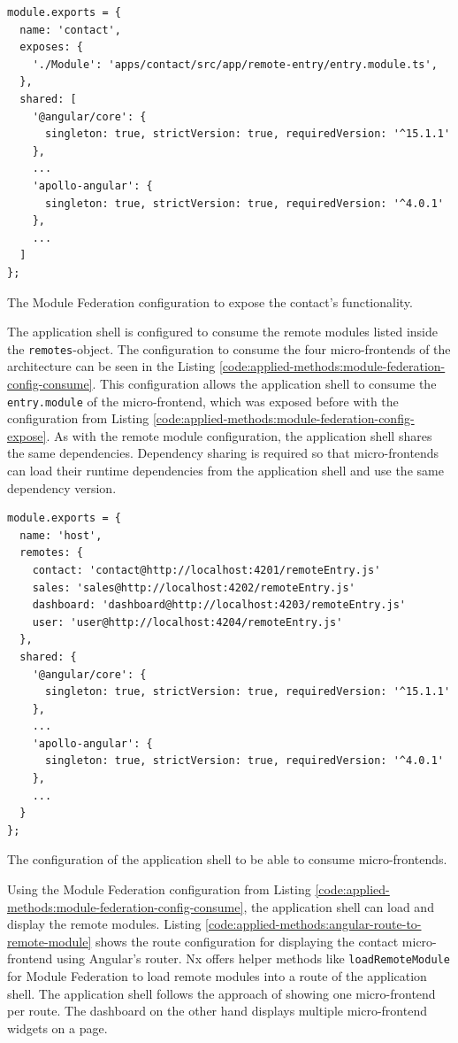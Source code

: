 \ifshowListings
\begin{listing}[H]
  \begin{verbatim}
module.exports = {
  name: 'contact',
  exposes: {
    './Module': 'apps/contact/src/app/remote-entry/entry.module.ts',
  },
  shared: [
    '@angular/core': {
      singleton: true, strictVersion: true, requiredVersion: '^15.1.1' 
    },
    ...
    'apollo-angular': { 
      singleton: true, strictVersion: true, requiredVersion: '^4.0.1' 
    },
    ...
  ]
};
  \end{verbatim}
  \caption{The Module Federation configuration to expose the contact's functionality.}\label{code:applied-methods:module-federation-config-expose}
\end{listing}
\fi

\noindent The application shell is configured to consume the remote modules listed inside the \texttt{remotes}-object. The configuration to consume the four micro-frontends of the architecture can be seen in the Listing \ref{code:applied-methods:module-federation-config-consume}. This configuration allows the application shell to consume the \texttt{entry.module} of the micro-frontend, which was exposed before with the configuration from Listing \ref{code:applied-methods:module-federation-config-expose}. As with the remote module configuration, the application shell shares the same dependencies. Dependency sharing is required so that micro-frontends can load their runtime dependencies from the application shell and use the same dependency version.

\ifshowListings
\begin{listing}[H]
  \begin{verbatim}
module.exports = {
  name: 'host',
  remotes: {
    contact: 'contact@http://localhost:4201/remoteEntry.js'
    sales: 'sales@http://localhost:4202/remoteEntry.js'
    dashboard: 'dashboard@http://localhost:4203/remoteEntry.js'
    user: 'user@http://localhost:4204/remoteEntry.js'
  },
  shared: {
    '@angular/core': {
      singleton: true, strictVersion: true, requiredVersion: '^15.1.1' 
    },
    ...
    'apollo-angular': { 
      singleton: true, strictVersion: true, requiredVersion: '^4.0.1' 
    },
    ...
  }
};
  \end{verbatim}
  \caption{The configuration of the application shell to be able to consume micro-frontends.}\label{code:applied-methods:module-federation-config-consume}
\end{listing}
\fi

\noindent Using the Module Federation configuration from Listing \ref{code:applied-methods:module-federation-config-consume}, the application shell can load and display the remote modules. Listing \ref{code:applied-methods:angular-route-to-remote-module} shows the route configuration for displaying the contact micro-frontend using Angular's router. Nx offers helper methods like \texttt{loadRemoteModule} for Module Federation to load remote modules into a route of the application shell. The application shell follows the approach of showing one micro-frontend per route. The dashboard on the other hand displays multiple micro-frontend widgets on a page.

